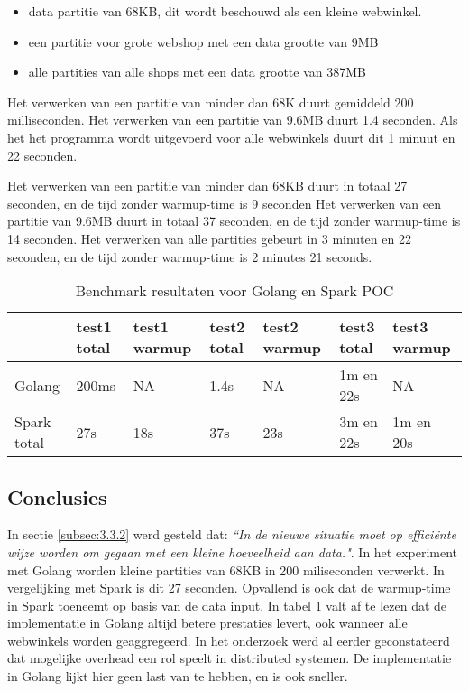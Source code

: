 \begin{itemize}
    \item data partitie van 68KB, dit wordt beschouwd als een kleine webwinkel.
    \item een partitie voor grote webshop met een data grootte van 9MB
    \item alle partities van alle shops met een data grootte van 387MB
\end{itemize}


Het verwerken van een partitie van minder dan 68K duurt gemiddeld 200 milliseconden.
Het verwerken van een partitie van 9.6MB duurt 1.4 seconden. Als het het programma wordt uitgevoerd voor alle webwinkels duurt dit 1 minuut en 22 seconden.

Het verwerken van een partitie van minder dan 68KB duurt in totaal 27 seconden, en de tijd zonder warmup-time is 9 seconden
Het verwerken van een partitie van 9.6MB duurt in totaal 37 seconden, en de tijd zonder warmup-time is 14 seconden. Het verwerken van alle partities gebeurt in 3 minuten en 22 seconden, en de tijd zonder warmup-time is 2 minutes 21 seconds.

\begin{table}[h]
\centering
\caption{Benchmark resultaten voor Golang en Spark POC}
\label{tab:benchmarks}
\begin{tabular}{|l|l|l|l|l|l|l|}
\hline
            & test1 total & test1 warmup & test2 total & test2 warmup & test3 total & test3 warmup \\ \hline
Golang      & 200ms       & NA           & 1.4s        & NA           & 1m en 22s   & NA           \\ \hline
Spark total & 27s         & 18s          & 37s         & 23s          & 3m en 22s   & 1m en 20s    \\ \hline
\end{tabular}
\end{table}

\subsection{Conclusies}

In sectie \ref{subsec:3.3.2} werd gesteld dat: \textit{``In de nieuwe situatie moet op efficiënte wijze worden om gegaan met een kleine hoeveelheid aan data."}. In het experiment met Golang worden kleine partities van 68KB in 200 miliseconden verwerkt. In vergelijking met Spark is dit 27 seconden. Opvallend is ook dat de warmup-time in Spark toeneemt op basis van de data input. In tabel \ref{tab:benchmarks} valt af te lezen dat de implementatie in Golang altijd betere prestaties levert, ook wanneer alle webwinkels worden geaggregeerd. In het onderzoek werd al eerder geconstateerd dat mogelijke overhead een rol speelt in distributed systemen. De implementatie in Golang lijkt hier geen last van te hebben, en is ook sneller.

